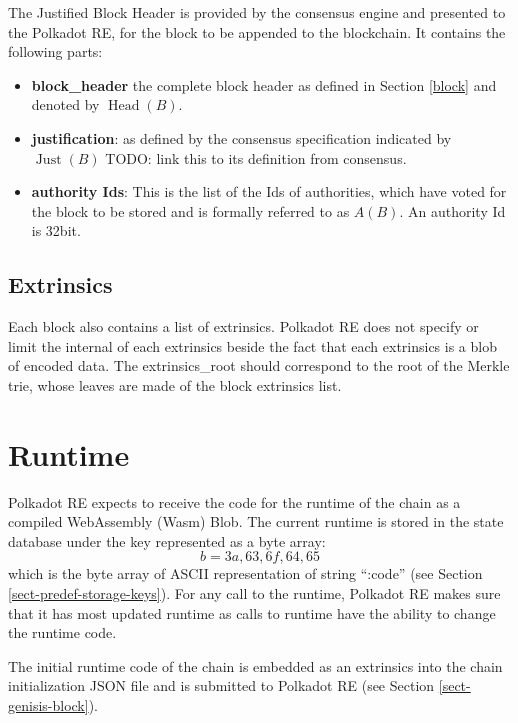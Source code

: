 \documentclass{article}
\newcommand{\tmop}[1]{\ensuremath{\operatorname{#1}}}
\newcommand{\tmsamp}[1]{\textsf{#1}}
\newcommand{\tmstrong}[1]{\textbf{#1}}
\newcommand{\tmtextbf}[1]{{\bfseries{#1}}}
\newcommand{\tmtextsf}[1]{{\sffamily{#1}}}
\providecommand{\tmop}[1]{\ensuremath{\mathrm{#1}}}
\providecommand{\tmsamp}[1]{\tmtextsf{#1}}
\providecommand{\tmstrong}[1]{\tmtextbf{#1}}
\providecommand{\tmtextbf}[1]{\tmtextbf{#1}}
\newcommand{\todo}[1]{{\color{red} TODO: {#1}}}
\begin{document}
The Justified Block Header is provided by the consensus engine and presented
to the Polkadot RE, for the block to be appended to the blockchain. It
contains the following parts:
\begin{itemize}
  \item {\tmstrong{{\tmsamp{{\tmstrong{block\_header}}}}}} the complete block
  header as defined in Section \ref{block} and denoted by $\tmop{Head} (B)$.
  
  \item {\tmstrong{{\tmsamp{justification}}}}: as defined by the consensus
  specification indicated by $\tmop{Just} (B)$ {\todo{link this to its
  definition from consensus}}.
  
  \item {\tmstrong{{\tmsamp{authority Ids}}}}: This is the list of the Ids of
  authorities, which have voted for the block to be stored and is formally
  referred to as $A (B)$. An authority Id is 32bit.
\end{itemize}

\subsection{Extrinsics}

Each block also contains a list of extrinsics. Polkadot RE does not specify or
limit the internal of each extrinsics beside the fact that each extrinsics is
a blob of encoded data. The {\tmsamp{extrinsics\_root}} should correspond to
the root of the Merkle trie, whose leaves are made of the block extrinsics
list.

\section{Runtime}\label{sect-entries-into-runtime}

Polkadot RE expects to receive the code for the runtime of the chain as a
compiled WebAssembly (Wasm) Blob. The current runtime is stored in the state
database under the key represented as a byte array:
\[ b = 3 a, 63, 6 f, 64, 65 \]
which is the byte array of ASCII representation of string ``:code'' (see
Section \ref{sect-predef-storage-keys}). For any call to the runtime, Polkadot
RE makes sure that it has most updated runtime as calls to runtime have the
ability to change the runtime code.

The initial runtime code of the chain is embedded as an extrinsics into the
chain initialization JSON file and is submitted to Polkadot RE (see Section
\ref{sect-genisis-block}).
\end{document}
